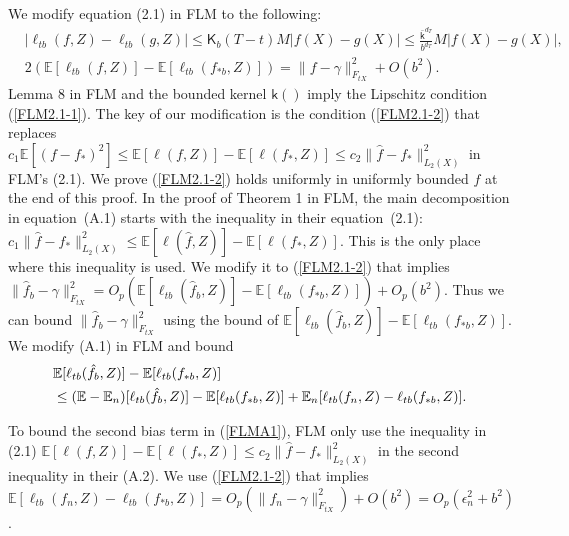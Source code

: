 \documentclass[lettersize, 12pt]{article}
\begin{document}
We modify equation (2.1) in FLM to the following:
\begin{align}
&\left| \ell_{tb}(f, Z) - \ell_{tb}(g, Z) \right| \leq 
\mathsf{K}_b\left(T-t\right) M \left| f(X) - g(X) \right|
\leq \frac{\bar{\mathsf{k}}^{d_T}}{b^{d_T}} M \left| f(X) - g(X) \right|, 
\label{FLM2.1-1} \tag{2.1-1}\\
&2\left(\mathbb{E}[\ell_{tb}(f, Z)] - \mathbb{E}[\ell_{tb}(f_{\ast b}, Z)] \right) = \|f-\gamma\|_{F_{tX}}^2 + O(b^2).
\label{FLM2.1-2}
\tag{2.1-2}
\end{align}
Lemma 8 in FLM and the bounded kernel $\mathsf{k}()$ imply the Lipschitz condition (\ref{FLM2.1-1}).
The key of our modification is the condition (\ref{FLM2.1-2}) that replaces $c_1\mathbb{E}[(f-f_\ast)^2] \leq \mathbb{E}[\ell(f,Z)] - \mathbb{E}[\ell(f_\ast, Z)] \leq  c_2 \|\hat f-f_\ast\|^2_{L_2(X)}$ in FLM's (2.1).
We prove (\ref{FLM2.1-2}) holds uniformly in uniformly bounded $f$ at the end of this proof.
In the proof of Theorem 1 in FLM, 
the main decomposition in equation~(A.1) starts with the inequality in their equation~(2.1):
$c_1 \|\hat f-f_\ast\|^2_{L_2(X)}  \leq \mathbb{E}[\ell(\hat f,Z)] - \mathbb{E}[\ell(f_\ast, Z)]$.
This is the only place where this inequality is used.  
We modify it to (\ref{FLM2.1-2}) that implies 
$\|\hat f_b-\gamma\|_{F_{tX}}^2 = O_p\left(\mathbb{E}[\ell_{tb}(\hat f_b, Z)] - \mathbb{E}[\ell_{tb}(f_{\ast b}, Z)] \right) + O_p(b^2)$. 
Thus we can bound $\|\hat f_b-\gamma\|_{F_{tX}}^2$ 
using the bound of $\mathbb{E}[\ell_{tb}(\hat f_b, Z)] - \mathbb{E}[\ell_{tb}(f_{\ast b}, Z)]$.
We modify (A.1) in FLM and bound
\begin{align}
&\mathbb{E}[\ell_{tb}(\hat f_b, Z)] - \mathbb{E}[\ell_{tb}(f_{\ast b}, Z)]  \notag
\\
&\leq 
(\mathbb{E} - \mathbb{E}_n)[\ell_{tb}(\hat f_b, Z)] - \mathbb{E}[\ell_{tb}(f_{\ast b}, Z)]
+ 
\mathbb{E}_n[\ell_{tb}(f_n, Z) - \ell_{tb}(f_{\ast b}, Z)].
\label{FLMA1} 
\end{align}

To bound the second bias term in (\ref{FLMA1}), FLM only use the inequality in (2.1) $\mathbb{E}[\ell(f,Z)] - \mathbb{E}[\ell(f_\ast, Z)] \leq  c_2 \|\hat f-f_\ast\|^2_{L_2(X)}$ in the second inequality in their (A.2). 
We use (\ref{FLM2.1-2}) that implies $\mathbb{E}[\ell_{tb}(f_n, Z) - \ell_{tb}(f_{\ast b}, Z)] = O_p(\|f_n-\gamma\|_{F_{tX}}^2) + O(b^2) = O_p(\epsilon_n^2 + b^2)$.
\end{document}
